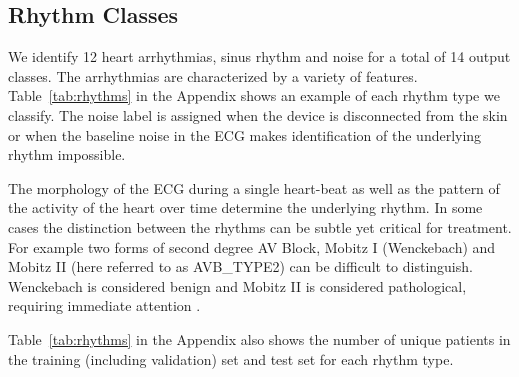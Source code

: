 \subsection*{Rhythm Classes}
We identify 12 heart arrhythmias, sinus rhythm and noise for a total of 14
output classes. The arrhythmias are characterized by a variety of features.
Table~\ref{tab:rhythms} in the Appendix shows an example of each rhythm type we
classify. The noise label is assigned when the device is disconnected from the
skin or when the baseline noise in the ECG makes identification of the
underlying rhythm impossible.

The morphology of the ECG during a single heart-beat as well as the pattern of
the activity of the heart over time determine the underlying rhythm. In some
cases the distinction between the rhythms can be subtle yet critical for
treatment. For example two forms of second degree AV Block, Mobitz I
(Wenckebach) and Mobitz II (here referred to as AVB\_TYPE2) can be difficult to
distinguish. Wenckebach is considered benign and Mobitz II is considered
pathological, requiring immediate attention \cite{dubin1996rapid}. 

Table~\ref{tab:rhythms} in the Appendix also shows the number of unique
patients in the training (including validation) set and test set for each
rhythm type.
